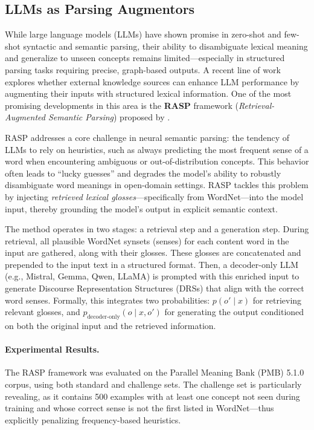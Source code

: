 \subsection{LLMs as Parsing Augmentors}

While large language models (LLMs) have shown promise in zero-shot and few-shot syntactic and semantic parsing, their ability to disambiguate lexical meaning and generalize to unseen concepts remains limited—especially in structured parsing tasks requiring precise, graph-based outputs. A recent line of work explores whether external knowledge sources can enhance LLM performance by augmenting their inputs with structured lexical information. One of the most promising developments in this area is the \textbf{RASP} framework (\textit{Retrieval-Augmented Semantic Parsing}) proposed by \citet{zhang2024rasp}.

RASP addresses a core challenge in neural semantic parsing: the tendency of LLMs to rely on heuristics, such as always predicting the most frequent sense of a word when encountering ambiguous or out-of-distribution concepts. This behavior often leads to ``lucky guesses'' and degrades the model's ability to robustly disambiguate word meanings in open-domain settings. RASP tackles this problem by injecting \textit{retrieved lexical glosses}—specifically from WordNet—into the model input, thereby grounding the model’s output in explicit semantic context.

The method operates in two stages: a retrieval step and a generation step. During retrieval, all plausible WordNet synsets (senses) for each content word in the input are gathered, along with their glosses. These glosses are concatenated and prepended to the input text in a structured format. Then, a decoder-only LLM (e.g., Mistral, Gemma, Qwen, LLaMA) is prompted with this enriched input to generate Discourse Representation Structures (DRSs) that align with the correct word senses. Formally, this integrates two probabilities: \( p(o' \mid x) \) for retrieving relevant glosses, and \( p_{\text{decoder-only}}(o \mid x, o') \) for generating the output conditioned on both the original input and the retrieved information.

\paragraph{Experimental Results.} The RASP framework was evaluated on the Parallel Meaning Bank (PMB) 5.1.0 corpus, using both standard and challenge sets. The challenge set is particularly revealing, as it contains 500 examples with at least one concept not seen during training and whose correct sense is not the first listed in WordNet—thus explicitly penalizing frequency-based heuristics.

